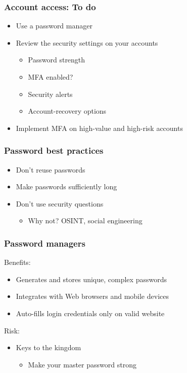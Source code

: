 \documentclass[blue]{beamer}
\begin{document}
\begin{frame}
\frametitle{Account access: To do}

\begin{itemize}
  \item Use a password manager
  \item Review the security settings on your accounts
  \begin{itemize}
    \item Password strength
    \item MFA enabled?
    \item Security alerts
    \item Account-recovery options
  \end{itemize}
  \item Implement MFA on high-value and high-risk accounts
\end{itemize}

\end{frame}



\begin{frame}
\frametitle{Password best practices}

\begin{itemize}
  \item Don't reuse passwords
  \item Make passwords sufficiently long
  \item Don't use security questions
  \begin{itemize}
    \item Why not? OSINT, social engineering
  \end{itemize}
\end{itemize}

\end{frame}



\begin{frame}
\frametitle{Password managers}

\begin{block}{Benefits:}
\begin{itemize}
  \item Generates and stores unique, complex passwords
  \item Integrates with Web browsers and mobile devices
  \item Auto-fills login credentials only on valid website
\end{itemize}
\end{block}

\begin{block}{Risk:}
\begin{itemize}
  \item Keys to the kingdom
  \begin{itemize}
    \item Make your master password strong
  \end{itemize}
\end{itemize}
\end{block}

\end{frame}
\end{document}
